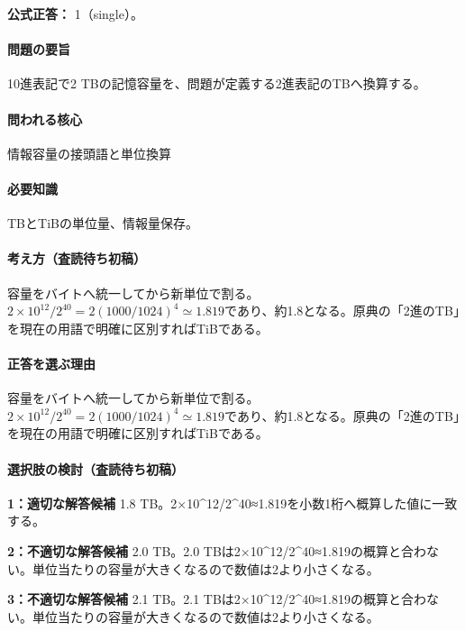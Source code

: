 \textbf{公式正答：} 1（single）。

\paragraph{問題の要旨} 10進表記で2 TBの記憶容量を、問題が定義する2進表記のTBへ換算する。

\paragraph{問われる核心} 情報容量の接頭語と単位換算

\paragraph{必要知識} TBとTiBの単位量、情報量保存。

\paragraph{考え方（査読待ち初稿）} 容量をバイトへ統一してから新単位で割る。\(2\times10^{12}/2^{40}=2(1000/1024)^4\simeq1.819\)であり、約1.8となる。原典の「2進のTB」を現在の用語で明確に区別すればTiBである。

\paragraph{正答を選ぶ理由} 容量をバイトへ統一してから新単位で割る。\(2\times10^{12}/2^{40}=2(1000/1024)^4\simeq1.819\)であり、約1.8となる。原典の「2進のTB」を現在の用語で明確に区別すればTiBである。

\paragraph{選択肢の検討（査読待ち初稿）}

\noindent\textbf{1：適切な解答候補} 1.8 TB。2×10\textasciicircum{}12/2\textasciicircum{}40≈1.819を小数1桁へ概算した値に一致する。\par

\noindent\textbf{2：不適切な解答候補} 2.0 TB。2.0 TBは2×10\textasciicircum{}12/2\textasciicircum{}40≈1.819の概算と合わない。単位当たりの容量が大きくなるので数値は2より小さくなる。\par

\noindent\textbf{3：不適切な解答候補} 2.1 TB。2.1 TBは2×10\textasciicircum{}12/2\textasciicircum{}40≈1.819の概算と合わない。単位当たりの容量が大きくなるので数値は2より小さくなる。\par

